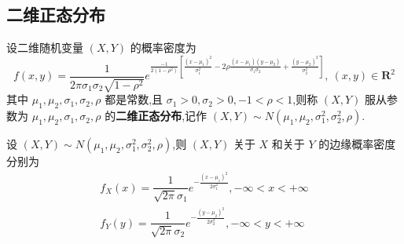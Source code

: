 \subsection{二维正态分布}

设二维随机变量 $(X,Y)$ 的概率密度为
$$
f(x,y) = \dfrac{1}{2 \pi \sigma_1 \sigma_2 \sqrt{1-\rho^2}} e^{\frac{-1}{2(1-\rho^2)} \left[ \frac{(x-\mu_1)^2}{\sigma_1^2} - 2 \rho \frac{(x-\mu_1)(y-\mu_2)}{\sigma_1 \sigma_2} + \frac{(y-\mu_2)^2}{\sigma_2^2} \right]},\ (x,y)\in \mathbf{R}^2
$$
其中 $\mu_1,\mu_2,\sigma_1,\sigma_2,\rho$ 都是常数,且 $\sigma_1 > 0, \sigma_2 > 0, -1 < \rho < 1$,则称 $(X,Y)$ 服从参数为 $\mu_1,\mu_2,\sigma_1,\sigma_2,\rho$ 的\textbf{二维正态分布},记作 $(X,Y) \sim N(\mu_1,\mu_2,\sigma_1^2,\sigma_2^2,\rho)$.

\begin{conclusion}
    设 $(X,Y) \sim N(\mu_1,\mu_2,\sigma_1^2,\sigma_2^2,\rho)$,则 $(X,Y)$ 关于 $X$ 和关于 $Y$ 的边缘概率密度分别为
    \begin{gather*}
        f_{X}(x) = \dfrac{1}{\sqrt{2\pi} \sigma_1} e^{-\frac{(x-\mu_1)^2}{2 \sigma_1^2}}, -\infty < x < +\infty \\
        f_{Y}(y) = \dfrac{1}{\sqrt{2\pi} \sigma_2} e^{-\frac{(y-\mu_2)^2}{2 \sigma_2^2}}, -\infty < y < +\infty
    \end{gather*}
\end{conclusion}

